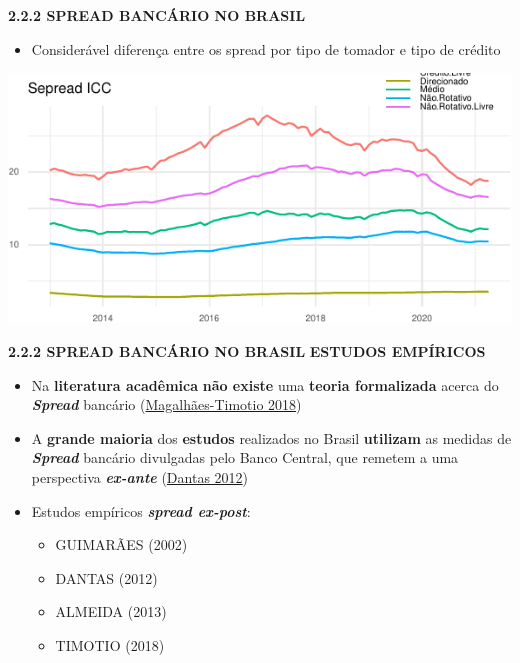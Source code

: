 \documentclass[
  ignorenonframetext,
  aspectratio=169,
  ignorenonframetext]{beamer}
\providecommand{\tightlist}{%
  \setlength{\itemsep}{0pt}\setlength{\parskip}{0pt}}
\begin{document}
\begin{frame}{\textbf{2.2.2 SPREAD BANCÁRIO NO BRASIL}}
\protect\hypertarget{spread-bancuxe1rio-no-brasil-1}{}
\begin{itemize}
\tightlist
\item
  Considerável diferença entre os spread por tipo de tomador e tipo de
  crédito
\end{itemize}

\begin{center}\includegraphics{02-final_presentation-V1_files/figure-beamer/spread.icc-1} \end{center}
\end{frame}

\begin{frame}{\textbf{2.2.2 SPREAD BANCÁRIO NO BRASIL}}
\protect\hypertarget{spread-bancuxe1rio-no-brasil-2}{}
\textbf{ESTUDOS EMPÍRICOS}

\begin{itemize}
\item
  Na \textbf{literatura acadêmica} \textbf{não existe} uma
  \textbf{teoria formalizada} acerca do \textbf{\emph{Spread}} bancário
  (\protect\hyperlink{ref-timotio:2018}{Magalhães-Timotio 2018})
\item
  A \textbf{grande maioria} dos \textbf{estudos} realizados no Brasil
  \textbf{utilizam} as medidas de \textbf{\emph{Spread}} bancário
  divulgadas pelo Banco Central, que remetem a uma perspectiva
  \textbf{\emph{ex-ante}} (\protect\hyperlink{ref-dantas:2012}{Dantas
  2012})
\item
  Estudos empíricos \textbf{\emph{spread ex-post}}:

  \begin{itemize}
  \tightlist
  \item
    GUIMARÃES (2002)
  \item
    DANTAS (2012)
  \item
    ALMEIDA (2013)
  \item
    TIMOTIO (2018)
  \end{itemize}
\end{itemize}
\end{frame}
\end{document}
